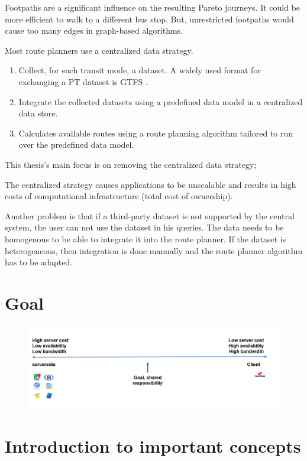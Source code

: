 Footpaths are a significant influence on the resulting Pareto journeys. It could be more efficient to walk to a different bus stop. But, unrestricted footpaths would cause too many edges in graph-based algorithms.

Most route planners use a centralized data strategy. \cite{julianIntro}
\begin{enumerate}
    \item Collect, for each transit mode, a dataset. A widely used format for exchanging a PT dataset is GTFS \cite{GTFS}.
    \item Integrate the collected datasets using a predefined data model in a centralized data store.
    \item Calculates available routes using a route planning algorithm tailored to run over the predefined data model.
\end{enumerate}

This thesis's main focus is on removing the centralized data strategy;

The centralized strategy causes applications to be unscalable and results in high costs of computational infrastructure (total cost of ownership). 

Another problem is that if a third-party dataset is not supported by the central system, the user can not use the dataset in his queries. The data needs to be homogenous to be able to integrate it into the route planner. If the dataset is heterogeneous, then integration is done manually and the route planner algorithm has to be adapted.
\section{Goal}


\begin{figure}[H]
    \centering
    \includegraphics[width=\textwidth]{images/shared responsibility.PNG}
    \caption{}
    \label{fig:sharedresponsibility}
\end{figure}
\section{Introduction to important concepts}
